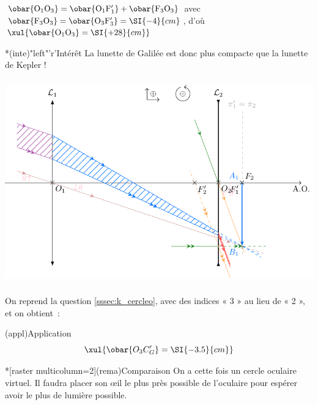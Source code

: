 \documentclass[../../main/main.tex]{subfiles}
\begin{document}
{\begin{tcbraster}[raster columns=2, raster equal height=rows]
\begin{tcb}
			$\obar{\rm O_1O_3} = \obar{\rm O_1F_1'} + \obar{\rm F_3O_3}$
			avec
			$\obar{\rm F_3O_3} = \obar{\rm O_3F_3'} = \SI{-4}{cm}$,
			d'où
			$\xul{\obar{\rm O_1O_3} = \SI{+28}{cm}}$

		\end{tcb}
		\begin{tcb}*(inte)"left"'r'{Intérêt}
			La lunette de Galilée est donc plus compacte que la lunette de Kepler !
		\end{tcb}
	\end{tcbraster}
	\vfill
	\subsubsection{}

	\begin{center}
		\includegraphics[width=\linewidth]{galilee.pdf}
	\end{center}

	\subsubsection{}
	On reprend la question \ref{sssec:k_cercleo}, avec des indices « 3 » au lieu de
	« 2 », et on obtient~:
	\begin{tcbraster}[raster columns=3, raster equal height=rows]
		\begin{tcb}[raster multicolumn=1](appl){Application}
			\[
				\xul{\obar{O_3C_G'} = \SI{-3.5}{cm}}
			\]
		\end{tcb}
		\begin{tcb}*[raster multicolumn=2](rema){Comparaison}
			On a cette fois un cercle oculaire virtuel. Il faudra placer son œil le
			plus près possible de l'oculaire pour espérer avoir le plus de lumière
			possible.
		\end{tcb}
	\end{tcbraster}

}
\end{document}
